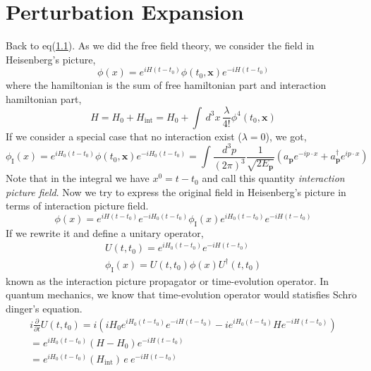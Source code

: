 \documentclass[12pt]{article}
\numberwithin{equation}{section}
\begin{document}
\section{Perturbation Expansion}
Back to eq(\hyperref[1.1]{1.1}).
As we did the free field theory, we consider the field in Heisenberg's picture,
\begin{equation}
    \phi(x) = e^{iH(t-t_0)}\phi(t_0,\mathbf{x})e^{-iH(t-t_0)}
\end{equation}
where the hamiltonian is the sum of free hamiltonian part and interaction hamiltonian part,
\begin{equation}
    H = H_0 + H_{\text{int}} = H_0 + \int\,d^3x\,\frac{\lambda}{4!}\phi^{4}(t_0,\mathbf{x})
\end{equation}
If we consider a special case that no interaction exist ($\lambda = 0$), we got,
\begin{equation}
    \phi_{\text{I}}(x) = e^{iH_0(t-t_0)}\phi(t_0, \mathbf{x})e^{-iH_0(t-t_0)} = \int{\frac{d^3p}{(2\pi)^3}\frac{1}{\sqrt{2E_{\mathbf{p}}}}\left(a_{\mathbf{p}}e^{-ip\cdot x} + a^{\dagger}_{\mathbf{p}}e^{ip\cdot x}\right)}
\end{equation}
Note that in the integral we have $x^0 = t - t_0$ and call this quantity \textit{interaction picture field}.
Now we try to express the original field in Heisenberg's picture in terms of interaction picture field.
\begin{equation}
    \phi(x) = e^{iH(t-t_0)}e^{-iH_0(t-t_0)}\phi_{\text{I}}(x)e^{iH_0(t-t_0)}e^{-iH(t-t_0)}
\end{equation}
If we rewrite it and define a unitary operator,
\begin{equation}
    \begin{split}
        U(t, t_0) = e^{iH_0(t-t_0)}e^{-iH(t-t_0)}\\
        \phi_{\text{I}}(x) = U(t,t_0)\phi(x)U^{\dagger}(t,t_0)
    \end{split}
\end{equation}
known as the interaction picture propagator or time-evolution operator. 
In quantum mechanics, we know that time-evolution operator would statisfies Schr$\ddot{\text{o}}$dinger's equation.
\begin{equation}
    \begin{split}
        i\frac{\partial}{\partial t}U(t, t_0) = i\left(iH_0e^{iH_0(t-t_0)}e^{-iH(t-t_0)}-ie^{iH_0(t-t_0)}He^{-iH(t-t_0)}\right)\\
        =e^{iH_0(t-t_0)}(H-H_0)e^{-iH(t-t_0)}\\
        =e^{iH_0(t-t_0)}(H_{\text{int}})\,e^{}\,e^{-iH(t-t_0)}
    \end{split}
\end{equation} 
\end{document}
